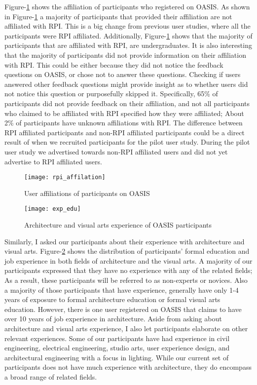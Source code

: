 Figure-\ref{fig:rpi_affilation} shows the affiliation of participants who registered on OASIS.
As shown in Figure-\ref{fig:rpi_affilation} a majority of participants that provided their affiliation are not affiliated with RPI. 
This is a big change from previous user studies, where all the participants were RPI affiliated.
Additionally, Figure-\ref{fig:rpi_affilation} shows that the majority of participants that are affiliated with RPI, are undergraduates.
It is also interesting that the majority of participants did not provide information on their affiliation with RPI.
This could be either because they did not notice the feedback questions on OASIS, or chose not to answer these questions.
Checking if users answered other feedback questions might provide insight as to whether users did not notice this question or purposefully skipped it. 
Specifically, 65\% of participants did not provide feedback on their affiliation, and not all participants who claimed to be affiliated with RPI specified how they were affiliated;
About 2\% of participants have unknown affiliations with RPI.
The difference between RPI affiliated participants and non-RPI affiliated participants could be a direct result of when we recruited participants for the pilot user study.
During the pilot user study we advertised towards non-RPI affiliated users and did not yet advertise to RPI affiliated users. 

	\begin{figure}[!ht]
	\centering
	\texttt{[image: rpi\_affilation]}
	\caption{User affiliations of participants on OASIS}
	\label{fig:rpi_affilation}
	\end{figure}

	\begin{figure}[!ht]
	\centering
	\texttt{[image: exp\_edu]}
	\caption{Architecture and visual arts experience of OASIS participants }
	\label{fig:exp_edu}
	\end{figure}

Similarly, I asked our participants about their experience with architecture and visual arts.
Figure-\ref{fig:exp_edu} shows the distribution of participants' formal education and job experience in both fields of architecture and the visual arts.
A majority of our participants expressed that they have no experience with any of the related fields;
As a result, these participants will be referred to as non-experts or novices.
Also a majority of those participants that have experience, generally have only 1-4 years of exposure to formal architecture education or formal visual arts education.
However, there is one user registered on OASIS that claims to have over 10 years of job experience in architecture.
Aside from asking about architecture and visual arts experience, I also let participants elaborate on other relevant experiences. 
Some of our participants have had experience in civil engineering, electrical engineering, studio arts, user experience design, and architectural engineering with a focus in lighting.
While our current set of participants does not have much experience with architecture, they do encompass a broad range of related fields.\\


